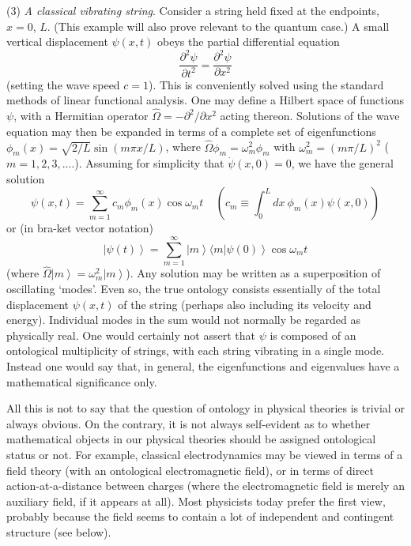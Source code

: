 \documentclass{article}%
\begin{document}
(3) \textit{A classical vibrating string}. Consider a string held fixed at the
endpoints, $x=0$, $L$. (This example will also prove relevant to the quantum
case.) A small vertical displacement $\psi(x,t)$ obeys the partial
differential equation%
\[
\frac{\partial^{2}\psi}{\partial t^{2}}=\frac{\partial^{2}\psi}{\partial
x^{2}}%
\]
(setting the wave speed $c=1$). This is conveniently solved using the standard
methods of linear functional analysis. One may define a Hilbert space of
functions $\psi$, with a Hermitian operator $\hat{\Omega}=-\partial
^{2}/\partial x^{2}$ acting thereon. Solutions of the wave equation may then
be expanded in terms of a complete set of eigenfunctions $\phi_{m}%
(x)=\sqrt{2/L}\sin\left(  m\pi x/L\right)  $, where $\hat{\Omega}\phi
_{m}=\omega_{m}^{2}\phi_{m}$ with $\omega_{m}^{2}=\left(  m\pi/L\right)  ^{2}$
($m=1,2,3,....$). Assuming for simplicity that $\dot{\psi}(x,0)=0$, we have
the general solution%
\[
\psi(x,t)=\sum_{m=1}^{\infty}c_{m}\phi_{m}(x)\cos\omega_{m}t\ \ \ \ \ \left(
c_{m}\equiv\int_{0}^{L}dx\ \phi_{m}(x)\psi(x,0)\right)
\]
or (in bra-ket vector notation)%
\[
\left\vert \psi(t)\right\rangle =\sum_{m=1}^{\infty}\left\vert m\right\rangle
\langle m\left\vert \psi(0)\right\rangle \cos\omega_{m}t
\]
(where $\hat{\Omega}\left\vert m\right\rangle =\omega_{m}^{2}\left\vert
m\right\rangle $). Any solution may be written as a superposition of
oscillating `modes'. Even so, the true ontology consists essentially of the
total displacement $\psi(x,t)$ of the string (perhaps also including its
velocity and energy). Individual modes in the sum would not normally be
regarded as physically real. One would certainly not assert that $\psi$ is
composed of an ontological multiplicity of strings, with each string vibrating
in a single mode. Instead one would say that, in general, the eigenfunctions
and eigenvalues have a mathematical significance only.

All this is not to say that the question of ontology in physical theories is
trivial or always obvious. On the contrary, it is not always self-evident as
to whether mathematical objects in our physical theories should be assigned
ontological status or not. For example, classical electrodynamics may be
viewed in terms of a field theory (with an ontological electromagnetic field),
or in terms of direct action-at-a-distance between charges (where the
electromagnetic field is merely an auxiliary field, if it appears at all).
Most physicists today prefer the first view, probably because the field seems
to contain a lot of independent and contingent structure (see below).
\end{document}
